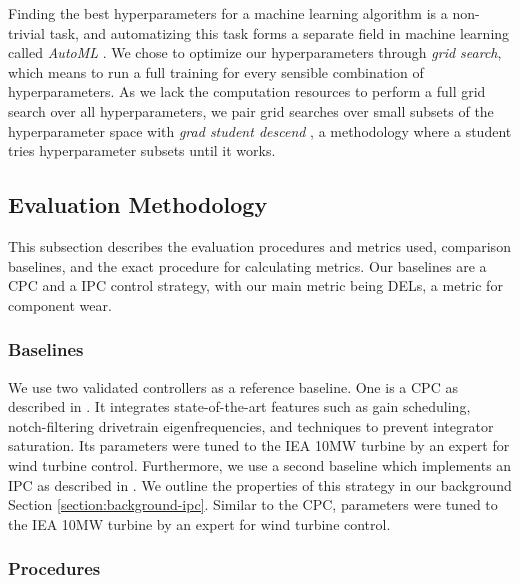 Finding the best hyperparameters for a machine learning algorithm is a non-trivial task, and automatizing this task forms a separate field in machine learning called \textit{AutoML} \cite{hutterAutomatedMachineLearning2019}. We chose to optimize our hyperparameters through \textit{grid search}, which means to run a full training for every sensible combination of hyperparameters. As we lack the computation resources to perform a full grid search over all hyperparameters, we pair grid searches over small subsets of the hyperparameter space with \textit{grad student descend} \cite{gencogluHARKSideDeep2019}, a methodology where a student tries hyperparameter subsets until it works.


\subsection{Evaluation Methodology}
\label{section:approach-evaluation-methodology}

\begin{summary}
This subsection describes the evaluation procedures and metrics used, comparison baselines, and the exact procedure for calculating metrics. Our baselines are a \ac{CPC} and a \ac{IPC} control strategy, with our main metric being DELs, a metric for component wear. 
\end{summary}

\subsubsection{Baselines}

We use two validated controllers as a reference baseline. One is a \acf{CPC} as described in \cite[Section 3.2.1]{perez-beckerImplementationValidationAdvanced2021}. It integrates state-of-the-art features such as gain scheduling, notch-filtering drivetrain eigenfrequencies, and techniques to prevent integrator saturation. Its parameters were tuned to the IEA 10MW turbine by an expert for wind turbine control. Furthermore, we use a second baseline which implements an \acf{IPC} as described in \cite[Section 3.2.2]{perez-beckerImplementationValidationAdvanced2021}. We outline the properties of this strategy in our background Section \ref{section:background-ipc}. Similar to the \ac{CPC}, parameters were tuned to the IEA 10MW turbine by an expert for wind turbine control.

\subsubsection{Procedures}

